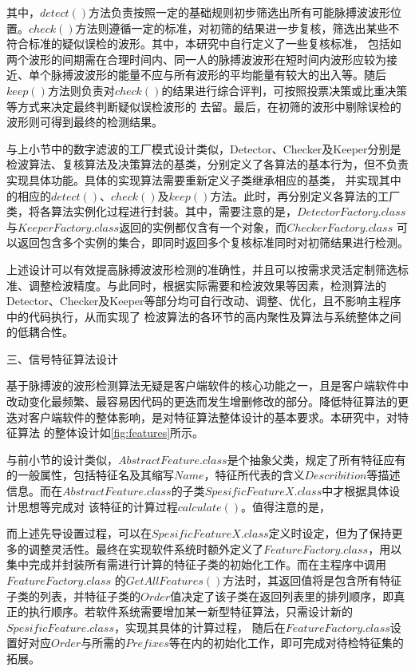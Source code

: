 其中，$detect()$方法负责按照一定的基础规则初步筛选出所有可能脉搏波波形位置。$check()$方法则遵循一定的标准，对初筛的结果进一步复核，筛选出某些不符合标准的疑似误检的波形。其中，本研究中自行定义了一些复核标准，
包括如两个波形的间期需在合理时间内、同一人的脉搏波波形在短时间内波形应较为接近、单个脉搏波波形的能量不应与所有波形的平均能量有较大的出入等。随后$keep()$方法则负责对$check()$的结果进行综合评判，可按照投票决策或比重决策等方式来决定最终判断疑似误检波形的
去留。最后，在初筛的波形中剔除误检的波形则可得到最终的检测结果。

与上小节中的数字滤波的工厂模式设计类似，Detector、Checker及Keeper分别是检波算法、复核算法及决策算法的基类，分别定义了各算法的基本行为，但不负责实现具体功能。具体的实现算法需要重新定义子类继承相应的基类，
并实现其中的相应的$detect()$、$check()$及$keep()$方法。此时，再分别定义各算法的工厂类，将各算法实例化过程进行封装。其中，需要注意的是，$DetectorFactory.class$与$KeeperFactory.class$返回的实例都仅含有一个对象，而$CheckerFactory.class$
可以返回包含多个实例的集合，即同时返回多个复核标准同时对初筛结果进行检测。

上述设计可以有效提高脉搏波波形检测的准确性，并且可以按需求灵活定制筛选标准、调整检波精度。与此同时，根据实际需要和检波效果等因素，检测算法的Detector、Checker及Keeper等部分均可自行改动、调整、优化，且不影响主程序中的代码执行，从而实现了
检波算法的各环节的高内聚性及算法与系统整体之间的低耦合性。

三、信号特征算法设计

基于脉搏波的波形检测算法无疑是客户端软件的核心功能之一，且是客户端软件中改动变化最频繁、最容易因代码的更迭而发生增删修改的部分。降低特征算法的更迭对客户端软件的整体影响，是对特征算法整体设计的基本要求。本研究中，对特征算法
的整体设计如\autoref{fig:features}所示。

与前小节的设计类似，$AbstractFeature.class$是个抽象父类，规定了所有特征应有的一般属性，包括特征名及其缩写$Name$，特征所代表的含义$Describition$等描述信息。而在$AbstractFeature.class$的子类$SpesificFeatureX.class$中才根据具体设计思想等完成对
该特征的计算过程$calculate()$。值得注意的是，

而上述先导设置过程，可以在$SpesificFeatureX.class$定义时设定，但为了保持更多的调整灵活性。最终在实现软件系统时额外定义了$FeatureFactory.class$，用以集中完成并封装所有需进行计算的特征子类的初始化工作。而在主程序中调用$FeatureFactory.class$
的$GetAllFeatures()$方法时，其返回值将是包含所有特征子类的列表，并特征子类的$Order$值决定了该子类在返回列表里的排列顺序，即真正的执行顺序。若软件系统需要增加某一新型特征算法，只需设计新的$SpesificFeature.class$，实现其具体的计算过程，
随后在$FeatureFactory.class$设置好对应$Order$与所需的$Prefixes$等在内的初始化工作，即可完成对待检特征集的拓展。

